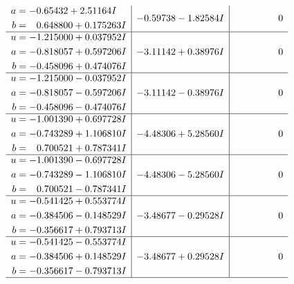 \documentclass[1p]{elsarticle_modified}
\theoremstyle{definition}
\begin{document}
$$\begin{array}{c|c|c}
\begin{aligned}
a &= -0.65432 + 2.51164 I \\
b &= \phantom{-}0.648800 + 0.175263 I\end{aligned}
 & -0.59738 - 1.82584 I & \phantom{-0.000000 } 0 \\ \hline\begin{aligned}
u &= -1.215000 + 0.037952 I \\
a &= -0.818057 + 0.597206 I \\
b &= -0.458096 + 0.474076 I\end{aligned}
 & -3.11142 + 0.38976 I & \phantom{-0.000000 } 0 \\ \hline\begin{aligned}
u &= -1.215000 - 0.037952 I \\
a &= -0.818057 - 0.597206 I \\
b &= -0.458096 - 0.474076 I\end{aligned}
 & -3.11142 - 0.38976 I & \phantom{-0.000000 } 0 \\ \hline\begin{aligned}
u &= -1.001390 + 0.697728 I \\
a &= -0.743289 + 1.106810 I \\
b &= \phantom{-}0.700521 + 0.787341 I\end{aligned}
 & -4.48306 + 5.28560 I & \phantom{-0.000000 } 0 \\ \hline\begin{aligned}
u &= -1.001390 - 0.697728 I \\
a &= -0.743289 - 1.106810 I \\
b &= \phantom{-}0.700521 - 0.787341 I\end{aligned}
 & -4.48306 - 5.28560 I & \phantom{-0.000000 } 0 \\ \hline\begin{aligned}
u &= -0.541425 + 0.553774 I \\
a &= -0.384506 - 0.148529 I \\
b &= -0.356617 + 0.793713 I\end{aligned}
 & -3.48677 - 0.29528 I & \phantom{-0.000000 } 0 \\ \hline\begin{aligned}
u &= -0.541425 - 0.553774 I \\
a &= -0.384506 + 0.148529 I \\
b &= -0.356617 - 0.793713 I\end{aligned}
 & -3.48677 + 0.29528 I & \phantom{-0.000000 } 0\\
 \hline 
 \end{array}$$\newpage$$\begin{array}{c|c|c}  

\end{array}$$
\end{document}
